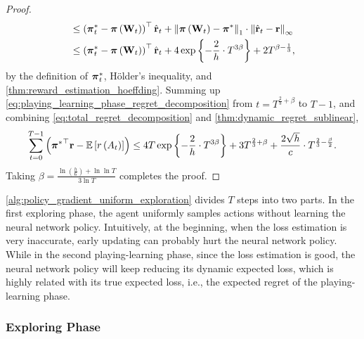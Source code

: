 \begin{proof}
\begin{equation}
\begin{split}
    &\le \left( {{\boldsymbol{\pi}}_t^*} - {\boldsymbol{\pi}}\left( {\mathbf{W}}_t \right) \right)^\top \hat{{\mathbf{r}}}_t  + \left\| {\boldsymbol{\pi}}\left( {\mathbf{W}}_t \right) - {\boldsymbol{\pi}}^* \right\|_1 \cdot \left\| \hat{{\mathbf{r}}}_t - {\mathbf{r}} \right\|_\infty  \\
    &\le \left( {{\boldsymbol{\pi}}_t^*} - {\boldsymbol{\pi}}\left( {\mathbf{W}}_t \right) \right)^\top \hat{{\mathbf{r}}}_t  + 4 \exp\left\{ - \frac{2}{h} \cdot  T^{3\beta} \right\} + 2 T^{\beta - \frac{1}{3}},
\end{split}
\end{equation}
by the definition of ${\boldsymbol{\pi}}_t^*$, H{\"o}lder's inequality, and \cref{thm:reward_estimation_hoeffding}. Summing up \cref{eq:playing_learning_phase_regret_decomposition} from $t = T^{\frac{2}{3} + \beta}$ to $T - 1$, and
combining \cref{eq:total_regret_decomposition} and \cref{thm:dynamic_regret_sublinear},
\begin{equation*}
\begin{split}
    \sum\limits_{t=0}^{T-1}{ \left( {{\boldsymbol{\pi}}^*}^\top {\mathbf{r}} - {\mathbb{E}} \left[ r\left(A_t\right) \right] \right) } \le  4 T \exp\left\{ - \frac{2}{h} \cdot  T^{3\beta} \right\} + 3 T^{\frac{2}{3} + \beta} + \frac{2 \sqrt{h}}{ c} \cdot T^{\frac{2}{3} - \frac{\beta}{2}}.
\end{split}
\end{equation*}
Taking $\beta = \frac{ \ln{\left(\frac{h}{6}\right) + \ln{\ln{T}} } }{ 3 \ln{T}} $ completes the proof.
\end{proof}

\cref{alg:policy_gradient_uniform_exploration} divides $T$ steps into two parts. In the first exploring phase, the agent uniformly samples actions without learning the neural network policy. Intuitively, at the beginning, when the loss estimation is very inaccurate, early updating can probably hurt the neural network policy.  While in the second playing-learning phase, since the loss estimation is good, the neural network policy will keep reducing its dynamic expected loss, which is highly related with its true expected loss, i.e., the expected regret of the playing-learning phase.

\subsubsection{Exploring Phase}
\label{subsubsec:exploring_phase}

